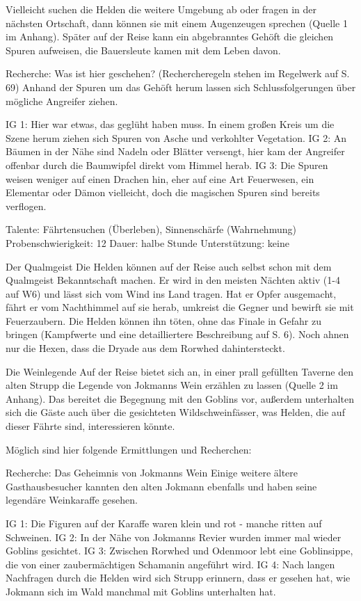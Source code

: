Vielleicht suchen die Helden die weitere Umgebung ab oder fragen in der nächsten Ortschaft, dann können sie mit einem Augenzeugen sprechen (Quelle 1 im Anhang). Später auf der Reise kann ein abgebranntes Gehöft die gleichen Spuren aufweisen, die Bauersleute kamen mit dem Leben davon.

Recherche: Was ist hier geschehen? (Rechercheregeln stehen im Regelwerk auf S. 69)
Anhand der Spuren um das Gehöft herum lassen sich Schlussfolgerungen über mögliche Angreifer ziehen.

IG 1: Hier war etwas, das geglüht haben muss. In einem großen Kreis um die Szene herum ziehen sich Spuren von Asche und verkohlter Vegetation.
IG 2: An Bäumen in der Nähe sind Nadeln oder Blätter versengt, hier kam der Angreifer offenbar durch die Baumwipfel direkt vom Himmel herab.
IG 3: Die Spuren weisen weniger auf einen Drachen hin, eher auf eine Art Feuerwesen, ein Elementar oder Dämon vielleicht, doch die magischen Spuren sind bereits verflogen.

Talente: Fährtensuchen (Überleben), Sinnenschärfe (Wahrnehmung)
Probenschwierigkeit: 12
Dauer: halbe Stunde
Unterstützung: keine

Der Qualmgeist
Die Helden können auf der Reise auch selbst schon mit dem Qualmgeist Bekanntschaft machen. Er wird in den meisten Nächten aktiv (1-4 auf W6) und lässt sich vom Wind ins Land tragen. Hat er Opfer ausgemacht, fährt er vom Nachthimmel auf sie herab, umkreist die Gegner und bewirft sie mit Feuerzaubern. Die Helden können ihn töten, ohne das Finale in Gefahr zu bringen (Kampfwerte und eine detailliertere Beschreibung auf S. 6). Noch ahnen nur die Hexen, dass die Dryade aus dem Rorwhed dahintersteckt.

Die Weinlegende
Auf der Reise bietet sich an, in einer prall gefüllten Taverne den alten Strupp die Legende von Jokmanns Wein erzählen zu lassen (Quelle 2 im Anhang). Das bereitet die Begegnung mit den Goblins vor, außerdem unterhalten sich die Gäste auch über die gesichteten Wildschweinfässer, was Helden, die auf dieser Fährte sind, interessieren könnte.

Möglich sind hier folgende Ermittlungen und Recherchen:

Recherche: Das Geheimnis von Jokmanns Wein
Einige weitere ältere Gasthausbesucher kannten den alten Jokmann ebenfalls und haben seine legendäre Weinkaraffe gesehen. 

IG 1: Die Figuren auf der Karaffe waren klein und rot  - manche ritten auf Schweinen.
IG 2: In der Nähe von Jokmanns Revier wurden immer mal wieder Goblins gesichtet.
IG 3: Zwischen Rorwhed und Odenmoor lebt eine Goblinsippe, die von einer zaubermächtigen Schamanin angeführt wird.
IG 4: Nach langen Nachfragen durch die Helden wird sich Strupp erinnern, dass er gesehen hat, wie Jokmann sich im Wald manchmal mit Goblins unterhalten hat.


